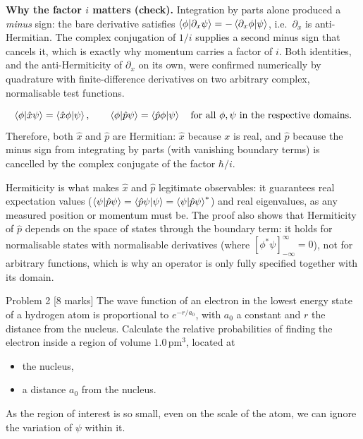 \documentclass[12pt]{article}
\begin{document}
\begin{solutionbox}
\textbf{Why the factor $i$ matters (check).} Integration by parts alone produced a \emph{minus} sign: the bare derivative satisfies $\braket{\phi|\partial_x\psi}=-\braket{\partial_x\phi|\psi}$, i.e.\ $\partial_x$ is anti-Hermitian. The complex conjugation of $1/i$ supplies a second minus sign that cancels it, which is exactly why momentum carries a factor of $i$. Both identities, and the anti-Hermiticity of $\partial_x$ on its own, were confirmed numerically by quadrature with finite-difference derivatives on two arbitrary complex, normalisable test functions.
\end{solutionbox}

\begin{answerbox}
\[
\braket{\phi|\hat x\psi}=\braket{\hat x\phi|\psi},\qquad
\braket{\phi|\hat p\psi}=\braket{\hat p\phi|\psi}\quad\text{for all }\phi,\psi\text{ in the respective domains.}
\]
Therefore, both $\hat x$ and $\hat p$ are Hermitian: $\hat x$ because $x$ is real, and $\hat p$ because the minus sign from integrating by parts (with vanishing boundary terms) is cancelled by the complex conjugate of the factor $\hbar/i$.
\end{answerbox}

\begin{insightbox}
Hermiticity is what makes $\hat x$ and $\hat p$ legitimate observables: it guarantees real expectation values ($\braket{\psi|\hat p\psi}=\braket{\hat p\psi|\psi}=\braket{\psi|\hat p\psi}^*$) and real eigenvalues, as any measured position or momentum must be. The proof also shows that Hermiticity of $\hat p$ depends on the space of states through the boundary term: it holds for normalisable states with normalisable derivatives (where $[\phi^*\psi]_{-\infty}^{\infty}=0$), not for arbitrary functions, which is why an operator is only fully specified together with its domain.
\end{insightbox}
\fi

\newpage
\begin{problembox}{Problem 2 \hfill [8 marks]}
The wave function of an electron in the lowest energy state of a hydrogen atom is proportional to $e^{-r/a_0}$, with $a_0$ a constant and $r$ the distance from the nucleus. Calculate the relative probabilities of finding the electron inside a region of volume $1.0\,\mathrm{pm}^3$, located at
\begin{itemize}
    \item the nucleus,
    \item a distance $a_0$ from the nucleus.
\end{itemize}

As the region of interest is so small, even on the scale of the atom, we can ignore the variation of $\psi$ within it.
\end{problembox}
\end{document}
